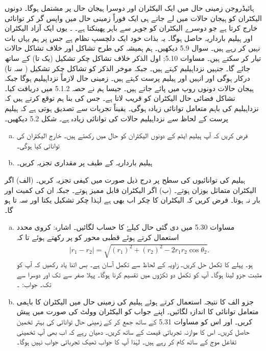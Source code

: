 ہائیڈروجن زمینی حال میں ایک الیکٹران اور دوسرا ہیجان حال پر مشتمل ہوگا۔ دونوں الیکٹران کو ہیجان حالات میں لے جاتے ہی ایک  فوراً  زمینی حال میں واپس گر کر توانائی خارج کرتا ہے جو دوسرے الیکٹران کو جوہر سے باہر  پھینکتا ہے۔  ۔ یوں ایک آزاد الیکٹران اور ہیلیم بارداریہ  حاصل ہوگا۔ یہ بذات خود ایک
دلچسپ نظام ہے جس پر ہم یہاں بات نہیں کر رہے ہیں۔ سوال 5.9 دیکھیں۔ ہم ہمیشہ کی طرح تشاکل اور خلاف تشاکل حالات تیار کر سکتے ہیں۔ مساوات 5.10;  اول الذکر خلاف تشاکل چکر تشکیل  (یک تا) کے ساتھ جائے گا۔ جنہیں نزداہیلیم کہتے ہیں۔ جبکہ موخر الذکر کو تشاکل چکر  تشکیل ( سہ تا)  درکار ہوگی اور انہیں اور ہیلیم  پرست  کہتے ہیں۔ زمینی حال لازماً نزداہیلیم ہوگا جبکہ ہیجان حالات دونوں روپ میں پائے جاتے ہیں۔ جیسا ہم نے حصہ 5.1.2 میں دریافت کیا۔ تشاکل فضائی حال الیکٹران کو قریب لاتا  ہے۔ جس کی بنا ہم توقع کرتے ہیں کہ نزداہیلیم کی باہم متعامل توانائی زیادہ ہوگی۔ یقیناً تجربات سے تصدیق ہوتی ہے کہ ہیلیم پرست کے لحاظ سے نزداہیلیم حالات کی توانائی زیادہ ہے۔ شکل 5.2 دیکھیں۔

\begin{enumerate}[a.]
\item
فرض کریں کہ آپ ہیلیم ایٹم کے دونوں الیکٹران کو  حال میں رکھتے ہیں۔ خارج الیکٹران کی توانائی کیا ہوگی۔
\item
ہیلیم بارداریہ  کے طیف پر مقداری تجزیہ کریں۔ 
\end{enumerate}
ہیلیم کی توانائیوں کی سطح پر درج ذیل صورت میں کیفی تجزیہ کریں۔ (الف) اگر الیکٹران متماثل بوزان ہوتے۔ (ب) اگر الیکٹران قابل ممیز ہوتے۔ جبکہ ان کی کمیت اور بار نہ ہوتا۔ فرض کریں کہ الیکٹران کا چکر اب بھی   ہے  لہٰذا   چکر تشکیل  یکتا اور سہ تا ہو گا۔
\begin{enumerate}[a.]
\item
مساوات 5.30 میں دی گئی حال   کیلۓ   کا حساب لگائیں۔ اشارہ: کروی محدد استعمال کرتے ہوئے قطبی محور کو  پر رکھتے ہوئے تا کہ
\begin{align}
|r_{1}-r_{2}|= \sqrt{(r_{1})^2+ (r_{2})^2 -2r_{1} r_{2}\cos\theta_{2}}.
\end{align}
ہو۔ پہلے     کا تکمل حل کریں۔ زاویہ        کے لحاظ سے تکمل آسان ہے۔ بس اتنا یاد رکھیں کہ آپ کو مثبت جزو لینا ہوگا۔ آپ کو           تکمل دو ٹکڑوں میں تقسیم کرنا ہوگا۔ پہلا صفر سے            تک اور دوسرا        سے  تک۔ جواب:  ۔ 
\item
جزو الف کا نتیجہ استعمال کرتے ہوئے ہیلیم کی زمینی حال میں الیکٹران کا باہمی متعامل توانائی کا اندازہ لگائیں۔ اپنے جواب کو الیکٹران وولٹ کی صورت میں پیش کریں۔ اور اس کو  مساوات 5.31 کے ساتھ جمع کر کے زمینی حال توانائی کی بہتر تخمین  حاصل کریں۔ اس کا موازنہ تجرباتی قیمت کے ساتھ کریں۔ دھیان رہے کہ اب بھی آپ تخمینی تفاعل موج کے ساتھ کام کر رہے ہیں۔ لہٰذا آپ کا جواب ٹھیک تجرباتی جواب نہیں ہوگا۔  
\end{enumerate}


